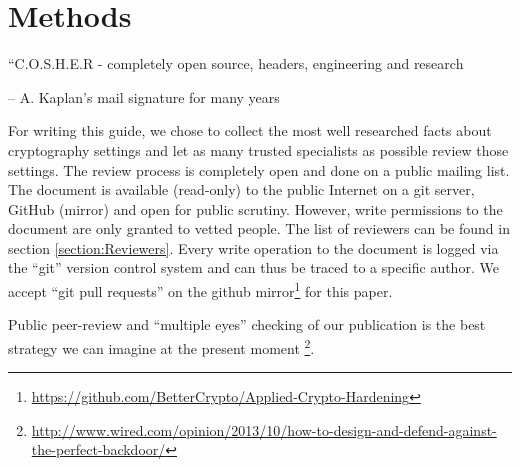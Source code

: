 \section{Methods}
\label{section:Methods}

\epigraph{``C.O.S.H.E.R - completely open source, headers, engineering and research}{-- A. Kaplan's mail signature for many years}


For writing this guide, we chose to collect the most well researched facts
about cryptography settings and let as many trusted specialists as possible
review those settings.  The review process is completely open and done on a
public mailing list. The document is available (read-only) to the public
Internet on a git server, GitHub (mirror) and open for public scrutiny.
However, write permissions to the document are only granted to vetted people.
The list of reviewers can be found in section \ref{section:Reviewers}.  Every
write operation to the document is logged via the ``git'' version control
system and can thus be traced to a specific author.  We accept ``git pull
requests'' on the github
mirror\footnote{\url{https://github.com/BetterCrypto/Applied-Crypto-Hardening}}
for this paper.

Public peer-review and ``multiple eyes'' checking of our publication is the
best strategy we can imagine at the present moment
\footnote{\url{http://www.wired.com/opinion/2013/10/how-to-design-and-defend-against-the-perfect-backdoor/}}.

